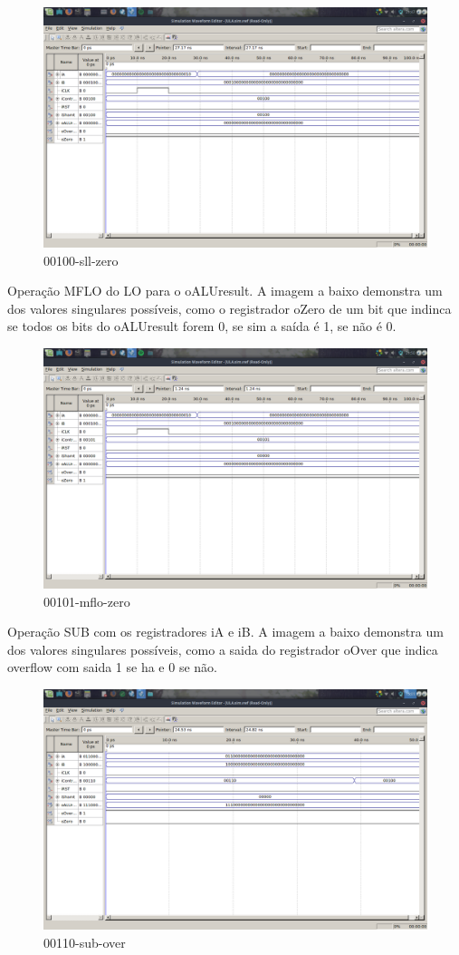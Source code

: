 \documentclass[12pt]{article}
\begin{document}
\begin{figure}[H]
	\centering
	\includegraphics[width=.8\textwidth]{00100-sll-zero.png}
	\caption{00100-sll-zero}
	\label{fig:00100-sll-zero}
\end{figure}
Operação MFLO do LO para o oALUresult.
A imagem a baixo demonstra um dos valores singulares possíveis, como o registrador oZero de um bit que indinca se todos os bits do oALUresult forem 0, se sim a saída é 1, se não é 0.
\begin{figure}[H]
	\centering
	\includegraphics[width=.8\textwidth]{00101-mflo-zero.png}
	\caption{00101-mflo-zero}
	\label{fig:00101-mflo-zero}
\end{figure}

Operação SUB com os registradores iA e iB.
A imagem a baixo demonstra um dos valores singulares possíveis, como a saida do registrador oOver que indica overflow com saida 1 se ha e 0 se não.
\begin{figure}[H]
	\centering
	\includegraphics[width=.8\textwidth]{00110-sub-over.png}
	\caption{00110-sub-over}
	\label{fig:00110-sub-over}
\end{figure}
\end{document}
